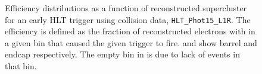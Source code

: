  \begin{figure}[htb]
  \begin{center}
  \end{center}
  \caption[\fixspacing Efficiency as a function of
  reconstructed supercluster \Et for an early HLT trigger]
  {\fixspacing Efficiency distributions as a function of
  reconstructed supercluster \Et for an early HLT trigger 
  using collision data, \texttt{HLT\_Phot15\_L1R}.
  The efficiency is defined as the fraction of reconstructed electrons
  with \Et in a given bin that caused the given trigger to fire.
   and  
  show barrel and endcap respectively. 
  The empty bin in  
  is due to lack of events in that bin.  
  }
  \label{fig:HLTEffs}
 \end{figure}








